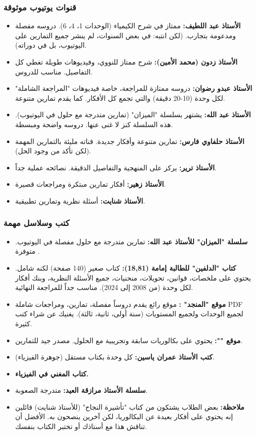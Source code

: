 \documentclass[12pt,a4paper]{book}
\begin{document}
	\subsubsection*{قنوات يوتيوب موثوقة}
	\begin{itemize}
		\item \textbf{الأستاذ عبد اللطيف:} ممتاز في شرح الكيمياء (الوحدات 1، 4، 6). دروسه مفصلة ومدعومة بتجارب. (لكن انتبه: في بعض السنوات، لم ينشر جميع التمارين على اليوتيوب، بل في دوراته).
		\item \textbf{الأستاذ زدون (محمد الأمين):} شرح ممتاز للنووي، وفيديوهات طويلة تغطي كل التفاصيل. مناسب للدروس.
		\item \textbf{الأستاذ عبدو رضوان:} دروسه ممتازة للمراجعة، خاصة فيديوهات "المراجعة الشاملة" لكل وحدة (10-20 دقيقة) والتي تجمع كل الأفكار. كما يقدم تمارين متنوعة.
		\item \textbf{الأستاذ عبد الله:} يشتهر بسلسلة "الميزان" (تمارين متدرجة مع حلول في اليوتيوب). هذه السلسلة كنز لا غنى عنها. دروسه واضحة ومبسطة.
		\item \textbf{الأستاذ حلفاوي فارس:} تمارين متنوعة وأفكار جديدة. قناته مليئة بالتمارين المهمة (لكن تأكد من وجود الحل).
		\item \textbf{الأستاذ ترير:} يركز على المنهجية والتفاصيل الدقيقة. نصائحه عملية جداً.
		\item \textbf{الأستاذ زهير:} أفكار تمارين مبتكرة ومراجعات قصيرة.
		\item \textbf{الأستاذ شنايت:} أسئلة نظرية وتمارين تطبيقية.
	\end{itemize}
	
	\subsubsection*{كتب وسلاسل مهمة}
	\begin{itemize}
		\item \textbf{سلسلة "الميزان" للأستاذ عبد الله:} تمارين متدرجة مع حلول مفصلة في اليوتيوب. متوفرة .
		\item \textbf{كتاب "الدلفين" للطالبة إمامة (18,81):} كتاب صغير (140 صفحة) لكنه شامل. يحتوي على ملخصات، قوانين، تحويلات، منحنيات، جميع الأسئلة النظرية، وبنك أفكار لكل وحدة (من 2008 إلى 2024). مناسب جداً للمراجعة النهائية.
		\item \textbf{موقع "المنجد" :} موقع رائع يقدم دروساً مفصلة، تمارين، ومراجعات شاملة PDF لجميع الوحدات ولجميع المستويات (سنة أولى، ثانية، ثالثة). يغنيك عن شراء كتب كثيرة.
		\item \textbf{موقع "":} يحتوي على بكالوريات سابقة وتجريبية مع الحلول. مصدر جيد للتمارين.
		\item \textbf{كتب الأستاذ عمران ياسين:} كل وحدة بكتاب مستقل (جوهرة الفيزياء).
		\item \textbf{كتاب المغني في الفيزياء.}
		\item \textbf{سلسلة الأستاذ مرازقة العيد:} متدرجة الصعوبة.
		\item \textbf{ملاحظة:} بعض الطلاب يشتكون من كتاب "تأشيرة النجاح" (للأستاذ شنايت) قائلين إنه يحتوي على أفكار بعيدة عن البكالوريا، لكن آخرين ينصحون به. الأفضل أن تناقش هذا مع أستاذك أو تختبر الكتاب بنفسك.
	\end{itemize}
	
\end{document}
